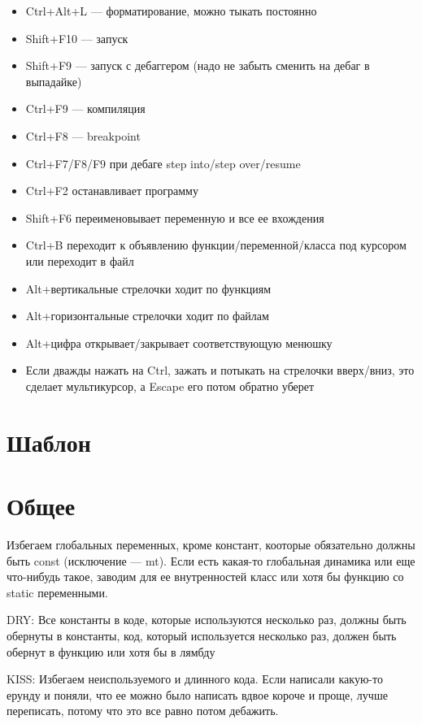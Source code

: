 \documentclass[12pt,a4paper,russian]{article}
\begin{document}
\begin{itemize}
	\item Ctrl+Alt+L --- форматирование, можно тыкать постоянно
	\item Shift+F10 --- запуск
	\item Shift+F9 --- запуск с дебаггером (надо не забыть сменить на дебаг в выпадайке)
	\item Ctrl+F9 --- компиляция
	\item Ctrl+F8 --- breakpoint
	\item Ctrl+F7/F8/F9 при дебаге step into/step over/resume
	\item Ctrl+F2 останавливает программу
	\item Shift+F6 переименовывает переменную и все ее вхождения
	\item Ctrl+B переходит к объявлению функции/переменной/класса под курсором или переходит в файл
	\item Alt+вертикальные стрелочки ходит по функциям
	\item Alt+горизонтальные стрелочки ходит по файлам
	\item Alt+цифра открывает/закрывает соответствующую менюшку
	\item Если дважды нажать на Ctrl, зажать и потыкать на стрелочки вверх/вниз, это сделает мультикурсор, а Escape его потом обратно уберет
\end{itemize}

\section{Шаблон}



\section{Общее}

Избегаем глобальных переменных, кроме констант, кооторые обязательно должны быть const (исключение --- mt). Если есть какая-то глобальная динамика или еще что-нибудь такое, заводим для ее внутренностей класс или хотя бы функцию со static переменными.

DRY: Все константы в коде, которые используются несколько раз, должны быть обернуты в константы, код, который используется несколько раз, должен быть обернут в функцию или хотя бы в лямбду

KISS: Избегаем неиспользуемого и длинного кода. Если написали какую-то ерунду и поняли, что ее можно было написать вдвое короче и проще, лучше переписать, потому что это все равно потом дебажить.
\end{document}
